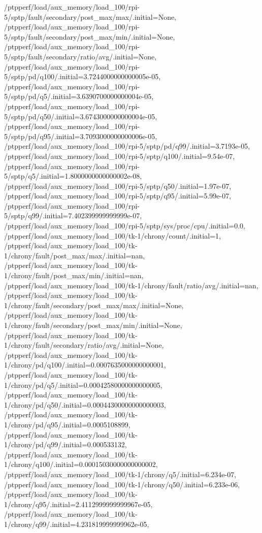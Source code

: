 {    /ptpperf/load/aux_memory/load_100/rpi-5/sptp/fault/secondary/post_max/max/.initial=None,
    /ptpperf/load/aux_memory/load_100/rpi-5/sptp/fault/secondary/post_max/min/.initial=None,
    /ptpperf/load/aux_memory/load_100/rpi-5/sptp/fault/secondary/ratio/avg/.initial=None,
    /ptpperf/load/aux_memory/load_100/rpi-5/sptp/pd/q100/.initial=3.7244000000000005e-05,
    /ptpperf/load/aux_memory/load_100/rpi-5/sptp/pd/q5/.initial=3.6390700000000004e-05,
    /ptpperf/load/aux_memory/load_100/rpi-5/sptp/pd/q50/.initial=3.6743000000000004e-05,
    /ptpperf/load/aux_memory/load_100/rpi-5/sptp/pd/q95/.initial=3.7093000000000006e-05,
    /ptpperf/load/aux_memory/load_100/rpi-5/sptp/pd/q99/.initial=3.7193e-05,
    /ptpperf/load/aux_memory/load_100/rpi-5/sptp/q100/.initial=9.54e-07,
    /ptpperf/load/aux_memory/load_100/rpi-5/sptp/q5/.initial=1.8000000000000002e-08,
    /ptpperf/load/aux_memory/load_100/rpi-5/sptp/q50/.initial=1.97e-07,
    /ptpperf/load/aux_memory/load_100/rpi-5/sptp/q95/.initial=5.99e-07,
    /ptpperf/load/aux_memory/load_100/rpi-5/sptp/q99/.initial=7.402399999999999e-07,
    /ptpperf/load/aux_memory/load_100/rpi-5/sptp/sys/proc/cpu/.initial=0.0,
    /ptpperf/load/aux_memory/load_100/tk-1/chrony/count/.initial=1,
    /ptpperf/load/aux_memory/load_100/tk-1/chrony/fault/post_max/max/.initial=nan,
    /ptpperf/load/aux_memory/load_100/tk-1/chrony/fault/post_max/min/.initial=nan,
    /ptpperf/load/aux_memory/load_100/tk-1/chrony/fault/ratio/avg/.initial=nan,
    /ptpperf/load/aux_memory/load_100/tk-1/chrony/fault/secondary/post_max/max/.initial=None,
    /ptpperf/load/aux_memory/load_100/tk-1/chrony/fault/secondary/post_max/min/.initial=None,
    /ptpperf/load/aux_memory/load_100/tk-1/chrony/fault/secondary/ratio/avg/.initial=None,
    /ptpperf/load/aux_memory/load_100/tk-1/chrony/pd/q100/.initial=0.0007635000000000001,
    /ptpperf/load/aux_memory/load_100/tk-1/chrony/pd/q5/.initial=0.00042580000000000005,
    /ptpperf/load/aux_memory/load_100/tk-1/chrony/pd/q50/.initial=0.00044300000000000003,
    /ptpperf/load/aux_memory/load_100/tk-1/chrony/pd/q95/.initial=0.0005108899,
    /ptpperf/load/aux_memory/load_100/tk-1/chrony/pd/q99/.initial=0.000533132,
    /ptpperf/load/aux_memory/load_100/tk-1/chrony/q100/.initial=0.00015030000000000002,
    /ptpperf/load/aux_memory/load_100/tk-1/chrony/q5/.initial=6.234e-07,
    /ptpperf/load/aux_memory/load_100/tk-1/chrony/q50/.initial=6.233e-06,
    /ptpperf/load/aux_memory/load_100/tk-1/chrony/q95/.initial=2.4112999999999967e-05,
    /ptpperf/load/aux_memory/load_100/tk-1/chrony/q99/.initial=4.231819999999962e-05,
}
